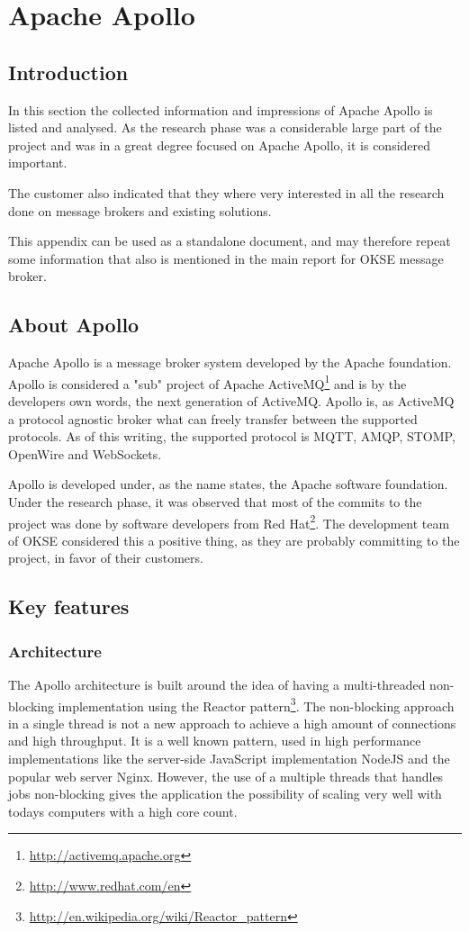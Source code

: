 \chapter{Apache Apollo}
\label{appendix:apache-apollo}

\section{Introduction}
In this section the collected information and impressions of Apache Apollo is listed and analysed. As the research phase was a considerable large part of the project and was in a great degree focused on Apache Apollo, it is considered important.

The customer also indicated that they where very interested in all the research done on message brokers and existing solutions.

This appendix can be used as a standalone document, and may therefore repeat some information that also is mentioned in the main report for OKSE message broker.

\section{About Apollo}
Apache Apollo is a message broker system developed by the Apache foundation. Apollo is considered a "sub" project of Apache ActiveMQ\footnote{\url{http://activemq.apache.org}} and is by the developers own words, the next generation of ActiveMQ. Apollo is, as ActiveMQ a protocol agnostic broker what can freely transfer between the supported protocols. As of this writing, the supported protocol is MQTT, AMQP, STOMP, OpenWire and WebSockets. 

Apollo is developed under, as the name states, the Apache software foundation. Under the research phase, it was observed that most of the commits to the project was done by software developers from Red Hat\footnote{\url{http://www.redhat.com/en}}. The development team of OKSE considered this a positive thing, as they are probably committing to the project, in favor of their customers. 

\section{Key features}

\subsection{Architecture}
The Apollo architecture is built around the idea of having a multi-threaded non-blocking implementation using the Reactor pattern\footnote{\url{http://en.wikipedia.org/wiki/Reactor_pattern}}. The non-blocking approach in a single thread is not a new approach to achieve a high amount of connections and high throughput. It is a well known pattern, used in high performance implementations like the server-side JavaScript implementation NodeJS and the popular web server Nginx. However, the use of a multiple threads that handles jobs non-blocking gives the application the possibility of scaling very well with todays computers with a high core count. 


